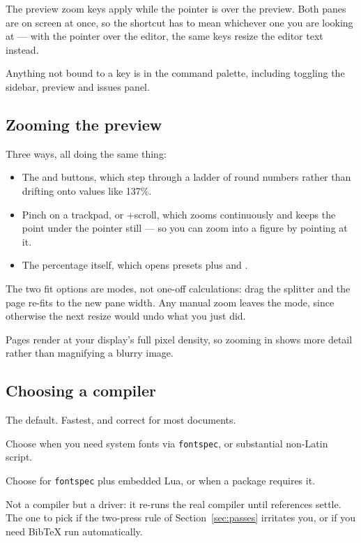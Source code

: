 The preview zoom keys apply while the pointer is over the preview. Both panes
are on screen at once, so the shortcut has to mean whichever one you are
looking at --- with the pointer over the editor, the same keys resize the
editor text instead.

Anything not bound to a key is in the command palette, including toggling the
sidebar, preview and issues panel.

\subsection{Zooming the preview}

Three ways, all doing the same thing:

\begin{itemize}[leftmargin=*]
  \item The \ui{$-$} and \ui{$+$} buttons, which step through a ladder of
        round numbers rather than drifting onto values like 137\%.
  \item Pinch on a trackpad, or +scroll, which zooms continuously and
        keeps the point under the pointer still --- so you can zoom into a
        figure by pointing at it.
  \item The percentage itself, which opens presets plus  and
        .
\end{itemize}

The two fit options are modes, not one-off calculations: drag the splitter and
the page re-fits to the new pane width. Any manual zoom leaves the mode, since
otherwise the next resize would undo what you just did.

Pages render at your display's full pixel density, so zooming in shows more
detail rather than magnifying a blurry image.

\subsection{Choosing a compiler}

\begin{description}[style=nextline, leftmargin=0pt, labelindent=0pt, labelwidth=0pt, font=\normalfont\ttfamily]
  \item[pdflatex] The default. Fastest, and correct for most documents.
  \item[xelatex] Choose when you need system fonts via \texttt{fontspec}, or
        substantial non-Latin script.
  \item[lualatex] Choose for \texttt{fontspec} plus embedded Lua, or when a
        package requires it.
  \item[latexmk] Not a compiler but a driver: it re-runs the real compiler
        until references settle. The one to pick if the two-press rule of
        Section~\ref{sec:passes} irritates you, or if you need BibTeX run
        automatically.
\end{description}

